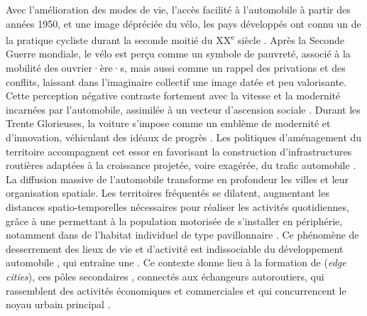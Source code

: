 \begin{refsegment}
Avec l’amélioration des modes de vie, l’accès facilité à l’automobile à partir des années 1950, et une image dépréciée du vélo, les pays développés ont connu un  de la pratique cycliste durant la seconde moitié du XX\textsuperscript{e} siècle \textcolor{blue}{\autocites[59-84]{heran_retour_2015}[9-10]{heran_retour_2024}}. Après la Seconde Guerre mondiale, le vélo est perçu comme un symbole de pauvreté, associé à la mobilité des ouvrier·ère·s, mais aussi comme un rappel des privations et des conflits, laissant dans l’imaginaire collectif une image datée et peu valorisante. Cette \gls{perception} négative contraste fortement avec la vitesse et la modernité incarnées par l’automobile, assimilée à un vecteur d’ascension sociale \textcolor{blue}{\autocite[59]{bertho-lavenir_scarcity_2015}}. Durant les Trente Glorieuses, la voiture s’impose comme un emblème de modernité et d’innovation, véhiculant des idéaux de progrès \textcolor{blue}{\autocite[35]{flonneau_georges_1999}}. Les politiques d’aménagement du territoire accompagnent cet essor en favorisant la construction d’infrastructures routières adaptées à la croissance projetée, voire exagérée, du trafic automobile \textcolor{blue}{\autocite[58]{wiel_transition_1999}}. La diffusion massive de l’automobile transforme en profondeur les villes et leur organisation spatiale. Les territoires fréquentés se dilatent, augmentant les distances spatio-temporelles nécessaires pour réaliser les activités quotidiennes, grâce à une  permettant à la population motorisée de s’installer en périphérie, notamment dans de l'habitat individuel de type pavillonnaire \textcolor{blue}{\autocite[58]{wiel_transition_1999}}. Ce phénomène de desserrement des lieux de vie et d’activité est indissociable du développement automobile \textcolor{blue}{\autocites[8]{newman_land_1996}[3]{aragau_periurbain_2018}}, qui entraîne une  \textcolor{blue}{\autocite[20]{wiel_transition_1999}}. Ce contexte donne lieu à la formation de  (\textsl{edge cities}), ces pôles secondaires , connectés aux échangeurs autoroutiers, qui rassemblent des activités économiques et commerciales et qui concurrencent le noyau urbain principal \textcolor{blue}{\autocite[]{garreau_edge_1991}}.%


\end{refsegment}

